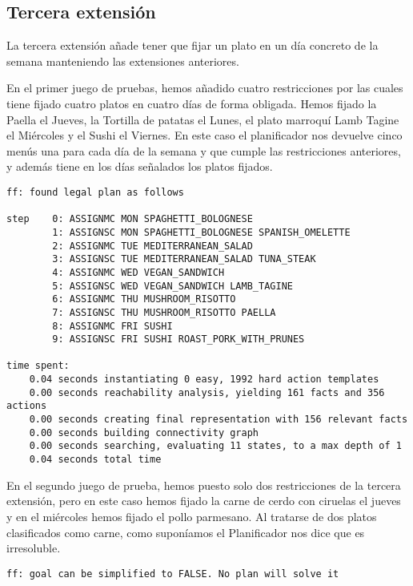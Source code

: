 \documentclass{article}
\begin{document}
\subsection{Tercera extensión}
La tercera extensión añade tener que fijar un plato en un día concreto de la semana manteniendo las extensiones anteriores.
\par
En el primer juego de pruebas, hemos añadido cuatro restricciones por las cuales tiene fijado cuatro platos en cuatro días de forma obligada. Hemos fijado la Paella el Jueves, la Tortilla de patatas el Lunes, el plato marroquí Lamb Tagine el Miércoles y el Sushi el Viernes. En este caso el planificador nos devuelve cinco menús una para cada día de la semana y que cumple las restricciones anteriores, y además tiene en los días señalados los platos fijados.
\begin{lstlisting}[language=none]
ff: found legal plan as follows

step    0: ASSIGNMC MON SPAGHETTI_BOLOGNESE
        1: ASSIGNSC MON SPAGHETTI_BOLOGNESE SPANISH_OMELETTE
        2: ASSIGNMC TUE MEDITERRANEAN_SALAD
        3: ASSIGNSC TUE MEDITERRANEAN_SALAD TUNA_STEAK
        4: ASSIGNMC WED VEGAN_SANDWICH
        5: ASSIGNSC WED VEGAN_SANDWICH LAMB_TAGINE
        6: ASSIGNMC THU MUSHROOM_RISOTTO
        7: ASSIGNSC THU MUSHROOM_RISOTTO PAELLA
        8: ASSIGNMC FRI SUSHI
        9: ASSIGNSC FRI SUSHI ROAST_PORK_WITH_PRUNES

time spent:
    0.04 seconds instantiating 0 easy, 1992 hard action templates
    0.00 seconds reachability analysis, yielding 161 facts and 356 actions
    0.00 seconds creating final representation with 156 relevant facts
    0.00 seconds building connectivity graph
    0.00 seconds searching, evaluating 11 states, to a max depth of 1
    0.04 seconds total time
\end{lstlisting}
En el segundo juego de prueba, hemos puesto solo dos restricciones de la tercera extensión, pero en este caso hemos fijado la carne de cerdo con ciruelas el jueves y en el miércoles hemos fijado el pollo parmesano. Al tratarse de dos platos clasificados como carne, como suponíamos el Planificador nos dice que es irresoluble.
\begin{lstlisting}[language=none]
ff: goal can be simplified to FALSE. No plan will solve it
\end{lstlisting}
\end{document}
